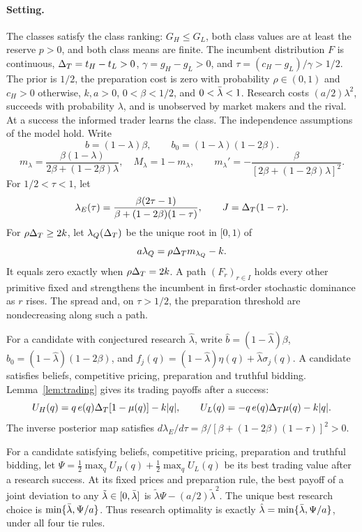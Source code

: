 \paragraph{Setting.}
The classes satisfy the class ranking: \(G_H\le G_L\), both class values are at least the reserve \(p>0\), and both class
means are finite. The incumbent distribution \(F\) is continuous, \(\Delta_T=t_H-t_L>0\), \(\gamma=g_H-g_L>0\), and
\(\tau=(c_H-g_L)/\gamma>1/2\). The prior is \(1/2\), the preparation cost is zero with probability
\(\rho\in(0,1)\) and \(c_H>0\) otherwise, \(k,a>0\), \(0<\beta<1/2\), and \(0<\bar\lambda<1\).
Research costs \((a/2)\lambda^2\), succeeds with probability \(\lambda\), and is unobserved by market makers
and the rival. At a success the informed trader learns the class. The independence assumptions of the model hold.
Write
\[
 b=(1-\lambda)\beta,\qquad b_0=(1-\lambda)(1-2\beta).
\]
\[
 m_\lambda=\frac{\beta(1-\lambda)}{2\beta+(1-2\beta)\lambda},\quad M_\lambda=1-m_\lambda,
 \qquad
 m_\lambda'=-\frac{\beta}{[2\beta+(1-2\beta)\lambda]^2}.
\]
For \(1/2<\tau<1\), let
\[
 \lambda_E(\tau)=\frac{\beta(2\tau-1)}{\beta+(1-2\beta)(1-\tau)},
 \qquad J=\Delta_T(1-\tau).
\]
For \(\rho\Delta_T\ge2k\), let \(\lambda_Q(\Delta_T)\) be the unique root in \([0,1)\) of
\begin{equation}\label{eq:a5-floor}
 a\lambda_Q=\rho\Delta_T m_{\lambda_Q}-k.
\end{equation}
It equals zero exactly when \(\rho\Delta_T=2k\).
A path \((F_r)_{r\in I}\) holds every other primitive fixed and strengthens the incumbent in first-order
stochastic dominance as \(r\) rises. The spread and, on \(\tau>1/2\), the preparation threshold are
nondecreasing along such a path.

For a candidate with conjectured research \(\hat\lambda\), write
\(\hat b=(1-\hat\lambda)\beta\), \(\hat b_0=(1-\hat\lambda)(1-2\beta)\), and
\(f_j(q)=(1-\hat\lambda)\eta(q)+\hat\lambda\sigma_j(q)\).
A candidate satisfies beliefs, competitive pricing, preparation and truthful bidding.
Lemma~\ref{lem:trading} gives its trading payoffs after a success:
\begin{equation}\label{eq:a5-payoffs}
 U_H(q)=q\,e(q)\Delta_T[1-\mu(q)]-k|q|,\qquad
 U_L(q)=-q\,e(q)\Delta_T\mu(q)-k|q|.
\end{equation}
The inverse posterior map satisfies
\(d\lambda_E/d\tau=\beta/[\beta+(1-2\beta)(1-\tau)]^2>0\).


\begin{lemma}\label{lem:a5-joint}
For a candidate satisfying beliefs, competitive pricing, preparation and truthful bidding, let
\(\Psi=\tfrac12\max_qU_H(q)+\tfrac12\max_qU_L(q)\) be its best trading value after a research success.
At its fixed prices and preparation rule, the best payoff of a joint deviation to any
\(\tilde\lambda\in[0,\bar\lambda]\) is \(\tilde\lambda\Psi-(a/2)\tilde\lambda^2\).
The unique best research choice is \(\min\{\bar\lambda,\Psi/a\}\). Thus research optimality is exactly
\(\hat\lambda=\min\{\bar\lambda,\Psi/a\}\), under all four tie rules.
\end{lemma}

